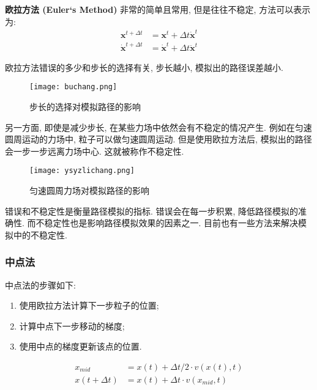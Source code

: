 \documentclass[openany]{progbookcn}
\begin{document}
\textbf{欧拉方法 (Euler‘s Method) }非常的简单且常用, 但是往往不稳定, 方法可以表示为: 
\begin{equation}
	\begin{split}
		\mathbf{x}^{t+\Delta t} &=\mathbf{x}^{t}+\Delta t \dot{\mathbf{x}}^{t} \\
		\dot{\mathbf{x}}^{t+\Delta t} &=\dot{\mathbf{x}}^{t}+\Delta t \ddot{\mathbf{x}}^{t}
	\end{split}
\end{equation}

欧拉方法错误的多少和步长的选择有关, 步长越小, 模拟出的路径误差越小. 

\begin{figure}[H]
	\centering
	\texttt{[image: buchang.png]}
	\caption{步长的选择对模拟路径的影响}
	\label{fig:buchang}
\end{figure}

另一方面, 即使是减少步长, 在某些力场中依然会有不稳定的情况产生. 例如在匀速圆周运动的力场中, 粒子可以做匀速圆周运动. 但是使用欧拉方法后, 模拟出的路径会一步一步远离力场中心. 这就被称作不稳定性. 

\begin{figure}[H]
	\centering
	\texttt{[image: ysyzlichang.png]}
	\caption{匀速圆周力场对模拟路径的影响}
	\label{fig:ysyz}
\end{figure}

错误和不稳定性是衡量路径模拟的指标. 错误会在每一步积累, 降低路径模拟的准确性. 而不稳定性也是影响路径模拟效果的因素之一. 目前也有一些方法来解决模拟中的不稳定性. 

\subsubsection{中点法}

中点法的步骤如下: 
\begin{enumerate}
	\item 使用欧拉方法计算下一步粒子的位置; 
	\item 计算中点下一步移动的梯度; 
	\item 使用中点的梯度更新该点的位置. 
\end{enumerate}

\begin{equation}
	\begin{split}
		x_{mid} &=x(t)+\Delta t / 2 \cdot v(x(t), t) \\
		x(t+\Delta t) &=x(t)+\Delta t \cdot v\left(x_{mid}, t\right)
	\end{split}
\end{equation}
\end{document}
